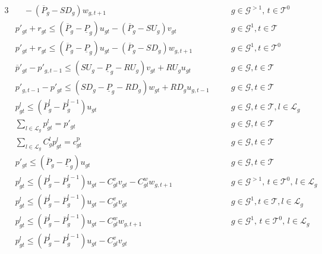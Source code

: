 \begin{alignat}{3}
& \quad - \left( \overline{P}_{g} - \textit{SD}_{g} \right) w_{g,t+1}
&& g\in\mathcal{G}^{>1}, \, t\in \mathcal{T}^0 \label{startramp}\\
%
& p'_{gt}+r_{gt}\leq \left( \overline{P}_{g} - \underline{P}_{g} \right) u_{gt} - \left( \overline{P}_{g}-\textit{SU}_{g} \right) v_{gt}
&& g\in\mathcal{G}^{1}, t\in\mathcal{T} \label{shutdownramp}\\
%
& p'_{gt}+r_{gt}\leq \left( \overline{P}_{g} - \underline{P}_{g} \right) u_{gt} - \left( \overline{P}_{g}-\textit{SD}_{g} \right) w_{g,t+1}
&& g\in\mathcal{G}^{1}, t \in \mathcal{T}^0 \label{shutdownramp2}\\
%
& \overline{p}'_{gt}-p'_{g,t-1}\leq (\textit{SU}_{g}-\underline{P}_{g} -RU_{g})v_{gt}+RU_{g}u_{gt} 
&& g\in\mathcal{G}, t\in\mathcal{T} \label{rampup}\\
%
& p'_{g,t-1}-p'_{gt}\leq (\textit{SD}_{g}-\underline{P}_{g}-RD_{g})w_{gt}+RD_{g}u_{g,t-1} \quad
&& g\in\mathcal{G},t\in\mathcal{T} \label{rampdown}\\
%
& p^{l}_{gt}\leq \left( \overline{P}^{l}_{g} - \overline{P}^{l-1}_{g} \right) u_{gt}
&& g\in\mathcal{G}, t\in\mathcal{T}, l\in\mathcal{L}_g \label{Staircase1}\\
%
& \sum_{l\in \mathcal{L}_g} p^{l}_{gt}=p'_{gt}
&& g\in\mathcal{G},t\in\mathcal{T} \label{Staircase2}\\
%
& \sum_{l\in \mathcal{L}_g} C^{l}_{g}p^{l}_{gt}=c_{gt}^{\text{p}}
&& g\in\mathcal{G},t\in\mathcal{T} \label{Staircase3}\\
%
& p'_{gt}\leq \left( \overline{P}_{g} - \underline{P}_{g} \right) u_{gt}
&& g\in\mathcal{G},t\in\mathcal{T} \label{Staircase4}\\
%
& p^{l}_{gt}\leq \left( \overline{P}^{l}_{g} - \overline{P}^{l-1}_{g} \right) u_{gt} - C^{v}_{gl}v_{gt} -C^{w}_{gl}w_{g,t+1} &&  g\in\mathcal{G}^{>1}, \, t\in \mathcal{T}^0, \, l\in\mathcal{L}_g \label{Staircase5}\\
%
& p^{l}_{gt}\leq \left( \overline{P}^{l}_{g} - \overline{P}^{l-1}_{g} \right) u_{gt} - C^{v}_{gl}v_{gt}
&& g\in\mathcal{G}^{1},t\in\mathcal{T},l\in\mathcal{L}_g \label{Staircase6}\\
%
& p^{l}_{gt}\leq \left( \overline{P}^{l}_{g} - \overline{P}^{l-1}_{g} \right) u_{gt} -C^{w}_{gl}w_{g,t+1} 
&&  g\in\mathcal{G}^{1},  \, t\in \mathcal{T}^0, \, l\in\mathcal{L}_g \label{Staircase7}\\
%
& p^{l}_{gt}\leq \left( \overline{P}^{l}_{g} - \overline{P}^{l-1}_{g} \right) u_{gt} - C^{v}_{gl}v_{gt} && \nonumber\\

\end{alignat}
